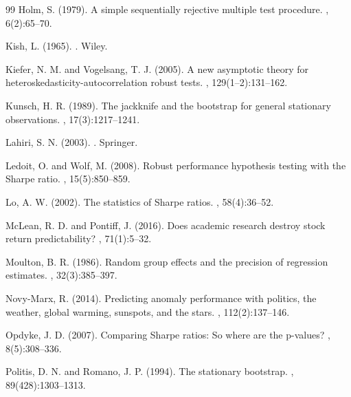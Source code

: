 \documentclass[12pt,a4paper]{article}
\begin{document}
\begin{thebibliography}{99}
Holm, S. (1979).
\newblock A simple sequentially rejective multiple test procedure.
, 6(2):65--70.

Kish, L. (1965).
.
\newblock Wiley.

Kiefer, N. M. and Vogelsang, T. J. (2005).
\newblock A new asymptotic theory for heteroskedasticity-autocorrelation robust tests.
, 129(1--2):131--162.

Kunsch, H. R. (1989).
\newblock The jackknife and the bootstrap for general stationary observations.
, 17(3):1217--1241.

Lahiri, S. N. (2003).
.
\newblock Springer.

Ledoit, O. and Wolf, M. (2008).
\newblock Robust performance hypothesis testing with the Sharpe ratio.
, 15(5):850--859.

Lo, A. W. (2002).
\newblock The statistics of Sharpe ratios.
, 58(4):36--52.

McLean, R. D. and Pontiff, J. (2016).
\newblock Does academic research destroy stock return predictability?
, 71(1):5--32.

Moulton, B. R. (1986).
\newblock Random group effects and the precision of regression estimates.
, 32(3):385--397.

Novy-Marx, R. (2014).
\newblock Predicting anomaly performance with politics, the weather, global warming, sunspots, and the stars.
, 112(2):137--146.

Opdyke, J. D. (2007).
\newblock Comparing Sharpe ratios: So where are the p-values?
, 8(5):308--336.

Politis, D. N. and Romano, J. P. (1994).
\newblock The stationary bootstrap.
, 89(428):1303--1313.


\end{thebibliography}
\end{document}
